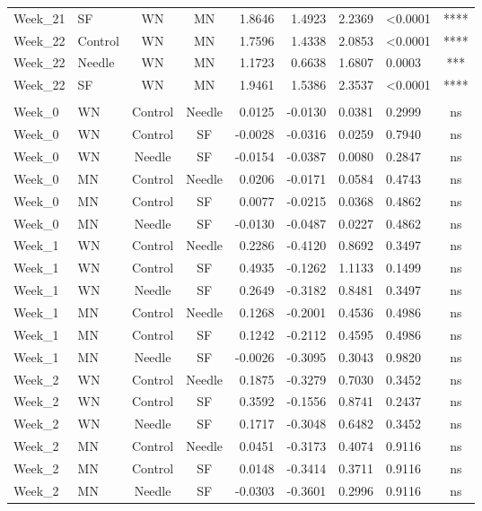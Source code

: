 \documentclass[
  12pt,
  letterpaper,
]{article}
\begin{document}
\begin{longtable}{llccrrrlc}
Week\_21 & SF & WN & MN & 1.8646 & 1.4923 & 2.2369 & <0.0001 & **** \\ 
Week\_22 & Control & WN & MN & 1.7596 & 1.4338 & 2.0853 & <0.0001 & **** \\ 
Week\_22 & Needle & WN & MN & 1.1723 & 0.6638 & 1.6807 & 0.0003 & *** \\ 
Week\_22 & SF & WN & MN & 1.9461 & 1.5386 & 2.3537 & <0.0001 & **** \\ 
\midrule\addlinespace[2.5pt]
\multicolumn{9}{l}{Split by Diet} \\ 
\midrule\addlinespace[2.5pt]
Week\_0 & WN & Control & Needle & 0.0125 & -0.0130 & 0.0381 & 0.2999 & ns \\ 
Week\_0 & WN & Control & SF & -0.0028 & -0.0316 & 0.0259 & 0.7940 & ns \\ 
Week\_0 & WN & Needle & SF & -0.0154 & -0.0387 & 0.0080 & 0.2847 & ns \\ 
Week\_0 & MN & Control & Needle & 0.0206 & -0.0171 & 0.0584 & 0.4743 & ns \\ 
Week\_0 & MN & Control & SF & 0.0077 & -0.0215 & 0.0368 & 0.4862 & ns \\ 
Week\_0 & MN & Needle & SF & -0.0130 & -0.0487 & 0.0227 & 0.4862 & ns \\ 
Week\_1 & WN & Control & Needle & 0.2286 & -0.4120 & 0.8692 & 0.3497 & ns \\ 
Week\_1 & WN & Control & SF & 0.4935 & -0.1262 & 1.1133 & 0.1499 & ns \\ 
Week\_1 & WN & Needle & SF & 0.2649 & -0.3182 & 0.8481 & 0.3497 & ns \\ 
Week\_1 & MN & Control & Needle & 0.1268 & -0.2001 & 0.4536 & 0.4986 & ns \\ 
Week\_1 & MN & Control & SF & 0.1242 & -0.2112 & 0.4595 & 0.4986 & ns \\ 
Week\_1 & MN & Needle & SF & -0.0026 & -0.3095 & 0.3043 & 0.9820 & ns \\ 
Week\_2 & WN & Control & Needle & 0.1875 & -0.3279 & 0.7030 & 0.3452 & ns \\ 
Week\_2 & WN & Control & SF & 0.3592 & -0.1556 & 0.8741 & 0.2437 & ns \\ 
Week\_2 & WN & Needle & SF & 0.1717 & -0.3048 & 0.6482 & 0.3452 & ns \\ 
Week\_2 & MN & Control & Needle & 0.0451 & -0.3173 & 0.4074 & 0.9116 & ns \\ 
Week\_2 & MN & Control & SF & 0.0148 & -0.3414 & 0.3711 & 0.9116 & ns \\ 
Week\_2 & MN & Needle & SF & -0.0303 & -0.3601 & 0.2996 & 0.9116 & ns \\ 

\end{longtable}
\end{document}

